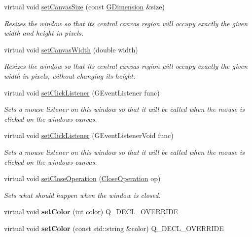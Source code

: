 \begin{DoxyCompactItemize}
virtual void \mbox{\hyperlink{classGWindow_a22f0f065a223a3c0ae5173316ece1dc1}{set\+Canvas\+Size}} (const \mbox{\hyperlink{classGDimension}{G\+Dimension}} \&size)
\begin{DoxyCompactList}\small\item\em Resizes the window so that its central canvas region will occupy exactly the given width and height in pixels. \end{DoxyCompactList}\item 
virtual void \mbox{\hyperlink{classGWindow_a455beafcfc20a2b7d9ac00499e222f0f}{set\+Canvas\+Width}} (double width)
\begin{DoxyCompactList}\small\item\em Resizes the window so that its central canvas region will occupy exactly the given width in pixels, without changing its height. \end{DoxyCompactList}\item 
virtual void \mbox{\hyperlink{classGWindow_abd40af6921242584d0954f173911b190}{set\+Click\+Listener}} (G\+Event\+Listener func)
\begin{DoxyCompactList}\small\item\em Sets a mouse listener on this window so that it will be called when the mouse is clicked on the window\textquotesingle{}s canvas. \end{DoxyCompactList}\item 
virtual void \mbox{\hyperlink{classGWindow_a856414c92df90f56f3877475eb3f8fc4}{set\+Click\+Listener}} (G\+Event\+Listener\+Void func)
\begin{DoxyCompactList}\small\item\em Sets a mouse listener on this window so that it will be called when the mouse is clicked on the window\textquotesingle{}s canvas. \end{DoxyCompactList}\item 
virtual void \mbox{\hyperlink{classGWindow_a8163e9440d0fb801a63ae9b3c90d5969}{set\+Close\+Operation}} (\mbox{\hyperlink{classGWindow_a84803201f0f9569db61f51cac9e0d2d2}{Close\+Operation}} op)
\begin{DoxyCompactList}\small\item\em Sets what should happen when the window is closed. \end{DoxyCompactList}\item 
virtual void {\bfseries set\+Color} (int color) Q\+\_\+\+D\+E\+C\+L\+\_\+\+O\+V\+E\+R\+R\+I\+DE
\item 
virtual void {\bfseries set\+Color} (const std\+::string \&color) Q\+\_\+\+D\+E\+C\+L\+\_\+\+O\+V\+E\+R\+R\+I\+DE

\end{DoxyCompactItemize}

